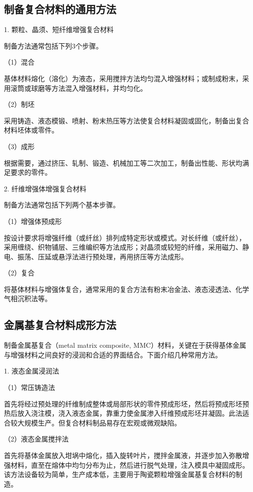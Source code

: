 \documentclass[UTF8]{ctexbook}
\newcommand{\◎}{\ensuremath{\bigcirc}}
\begin{document}
\subsection{制备复合材料的通用方法}

1. 颗粒、晶须、短纤维增强复合材料

制备方法通常包括下列3个步骤。

（1）混合

基体材料熔化（溶化）为液态，采用搅拌方法均匀混入增强材料；或制成粉末，采用滚筒或球磨等方法混入增强材料，并均匀化。

（2）制坯

采用铸造、液态模锻、喷射、粉末热压等方法使复合材料凝固或固化，制备出复合材料坯体或零件。

（3）成形

根据需要，通过挤压、轧制、锻造、机械加工等二次加工，制备出性能、形状均满足要求的零件。

2. 纤维增强体增强复合材料

制备方法通常包括下列两个基本步骤。

（1）增强体预成形

按设计要求将增强纤维（或纤丝）排列成特定形状或模式。对长纤维（或纤丝），采用缠绕、织物铺层、三维编织等方法成形；对晶须或较短的纤维，采用磁力、静电、振荡、压延或悬浮法进行预处理，再用挤压等方法成形。

（2）复合

将基体材料与增强体复合，通常采用的复合方法有粉末冶金法、液态浸透法、化学气相沉积法等。

\subsection{金属基复合材料成形方法}

制备金属基复合（metal matrix composite, MMC）材料，关键在于获得基体金属与增强材料之间良好的浸润和合适的界面结合。下面介绍几种常用方法。

1. 液态金属浸润法

（1）常压铸造法

首先将经过预处理的纤维制成整体或局部形状的零件预成形坯，然后将预成形坯预热后放入浇注模，浇入液态金属，靠重力使金属渗入纤维预成形坯并凝固。此法适合较大规模生产。但复合材料制品易存在宏观或微观缺陷。

（2）液态金属搅拌法

首先将基体金属放入坩埚中熔化，插入旋转叶片，搅拌金属液，并逐步加入弥散增强材料，直至在熔体中均匀分布为止，然后进行脱气处理，注入模具中凝固成形。该方法设备较为简单，生产成本低，主要用于陶瓷颗粒增强金属基复合材料的制造。
\end{document}

